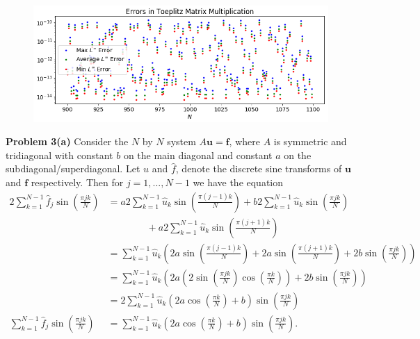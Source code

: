 \documentclass[12pt]{article}
\newcommand{\problem}[1]{\hspace{-4 ex} \large \textbf{Problem #1} }
\renewcommand{\vec}[1]{\boldsymbol{\mathbf{#1}}}
\begin{document}
\begin{figure}[H]
	\includegraphics[width=1\textwidth]{hw02_p2_b_toeplitz_mult_errors}
	\centering
\end{figure}

\bigbreak

\problem{3(a)} Consider the $N$ by $N$ system $A \vec{u} = \vec{f}$, where $A$ is symmetric and tridiagonal with constant $b$ on the main diagonal and constant $a$ on the subdiagonal/superdiagonal. Let $\hat{u}$ and $\hat{f}$, denote the discrete sine transforms of $\vec{u}$ and $\vec{f}$ respectively. Then for $j = 1, ..., N-1$ we have the equation
\begin{align*}
	2\sum\limits_{k=1}^{N-1} \hat{f}_{j} \sin \left(\tfrac{\pi jk}{N}\right) &= a2\sum\limits_{k=1}^{N-1} \hat{u}_{k} \sin \left(\tfrac{\pi (j-1)k}{N}\right) + b2 \sum\limits_{k=1}^{N-1} \hat{u}_k \sin \left(\tfrac{\pi jk}{N} \right)  \\
	&\phantom{===} + a2\sum\limits_{k=1}^{N-1} \hat{u}_{k} \sin \left(\tfrac{\pi (j+1)k}{N} \right) \\
	& = \sum\limits_{k=1}^{N-1} \hat{u}_{k} \left( 2a \sin \left(\tfrac{\pi (j-1)k}{N}\right) + 2a \sin \left(\tfrac{\pi (j+1)k}{N}\right)  + 2b \sin \left(\tfrac{\pi jk}{N} \right) \right) \\
	& = \sum\limits_{k=1}^{N-1} \hat{u}_{k} \left( 2a \left( 2\sin \left(\tfrac{\pi jk}{N}\right) \cos \left(\tfrac{\pi k}{N}\right) \right) + 2b \sin \left(\tfrac{\pi jk}{N} \right) \right) \\
	& = 2 \sum\limits_{k=1}^{N-1} \hat{u}_{k} \left( 2a\cos \left(\tfrac{\pi k}{N}\right) +b \right) \sin \left(\tfrac{\pi jk}{N}\right)\\
	\sum\limits_{k=1}^{N-1} \hat{f}_{j} \sin \left(\tfrac{\pi jk}{N}\right) &= \sum\limits_{k=1}^{N-1} \hat{u}_{k} \left( 2a\cos \left(\tfrac{\pi k}{N}\right) +b \right) \sin \left(\tfrac{\pi jk}{N}\right) \text{.}
\end{align*}
\end{document}
